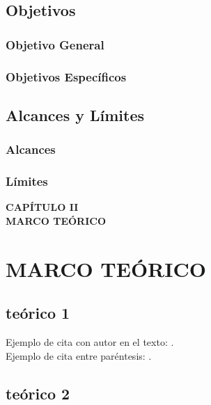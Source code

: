 \documentclass[12pt,oneside,letterpaper]{book}
\begin{document}
\section{Objetivos}
\lipsum[1]

\subsection{Objetivo General}
\lipsum[1]

\subsection{Objetivos Específicos}
\lipsum[1]

\section{Alcances y Límites}
\lipsum[1]

\subsection{Alcances}
\lipsum[1]

\subsection{Límites}
\lipsum[1]

\newpage
\thispagestyle{empty}
\vspace*{0.35\textheight}
\begin{center}
	{\Huge\textbf{CAPÍTULO II}} \\[0.5cm]
	{\Huge\textbf{MARCO TEÓRICO}}
\end{center}

\newpage
\chapter{MARCO TEÓRICO}
\thispagestyle{fancy}
\section{teórico 1}
\lipsum[1]
Ejemplo de cita con autor en el texto: \textcite{perez2021educacion}.\\
Ejemplo de cita entre paréntesis: \parencite{smith2020ai}.

\section{teórico 2}
\lipsum[1]
\end{document}
